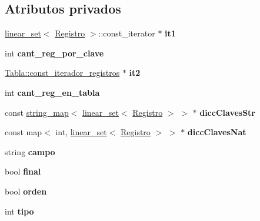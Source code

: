 \subsection*{Atributos privados}
\begin{DoxyCompactItemize}
\item 
\mbox{\label{classBaseDeDatos_1_1join__iterator_aa662879b0ff610fee1fdcfa90fe65566}} 
\mbox{\hyperlink{classlinear__set}{linear\+\_\+set}}$<$ \mbox{\hyperlink{classRegistro}{Registro}} $>$\+::const\+\_\+iterator $\ast$ {\bfseries it1}
\item 
\mbox{\label{classBaseDeDatos_1_1join__iterator_a6408fed210e97085361c6a079a209bd6}} 
int {\bfseries cant\+\_\+reg\+\_\+por\+\_\+clave}
\item 
\mbox{\label{classBaseDeDatos_1_1join__iterator_ac9aeb19f9d131c3339845ceb0b766d5e}} 
\mbox{\hyperlink{classTabla_1_1const__iterador__registros}{Tabla\+::const\+\_\+iterador\+\_\+registros}} $\ast$ {\bfseries it2}
\item 
\mbox{\label{classBaseDeDatos_1_1join__iterator_ac2b09142b4a59ff641f7eb5e1cd9d8c7}} 
int {\bfseries cant\+\_\+reg\+\_\+en\+\_\+tabla}
\item 
\mbox{\label{classBaseDeDatos_1_1join__iterator_aef13526352db3e9dc1c78e3fea681dcb}} 
const \mbox{\hyperlink{classstring__map}{string\+\_\+map}}$<$ \mbox{\hyperlink{classlinear__set}{linear\+\_\+set}}$<$ \mbox{\hyperlink{classRegistro}{Registro}} $>$ $>$ $\ast$ {\bfseries dicc\+Claves\+Str}
\item 
\mbox{\label{classBaseDeDatos_1_1join__iterator_ad7dd4cf63e115190ceab0998e3e0e5b3}} 
const map$<$ int, \mbox{\hyperlink{classlinear__set}{linear\+\_\+set}}$<$ \mbox{\hyperlink{classRegistro}{Registro}} $>$ $>$ $\ast$ {\bfseries dicc\+Claves\+Nat}
\item 
\mbox{\label{classBaseDeDatos_1_1join__iterator_a7500ea619b4be27f788b732470c7534b}} 
string {\bfseries campo}
\item 
\mbox{\label{classBaseDeDatos_1_1join__iterator_acbe8226a9d381df2d2835a744f40e8a6}} 
bool {\bfseries final}
\item 
\mbox{\label{classBaseDeDatos_1_1join__iterator_a8f31e5204de670f02cc5aa3b5032a5d7}} 
bool {\bfseries orden}
\item 
\mbox{\label{classBaseDeDatos_1_1join__iterator_a603f3c4c84a41802956f4d0475ed3022}} 
int {\bfseries tipo}
\end{DoxyCompactItemize}

